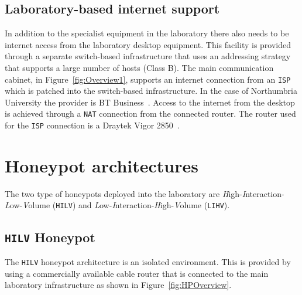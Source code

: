 \subsection{Laboratory-based internet support}
In addition to the specialist equipment in the laboratory there also needs to be internet access from the laboratory desktop equipment. This facility is provided through a separate switch-based infrastructure that uses an addressing strategy that supports a large number of hosts (Class B). The main communication cabinet, in Figure~\ref{fig:Overview1}, supports an internet connection from an \texttt{ISP} which is patched into the switch-based infrastructure. In the case of Northumbria University the provider is BT Business~\cite{BT:17}. Access to the internet from the desktop is achieved through a \texttt{NAT} connection from the connected router. The router used for the \texttt{ISP} connection is a Draytek Vigor 2850~\cite{DC:17}.

\section{Honeypot architectures}

The two type of honeypots deployed into the laboratory are \emph{H}igh-\emph{I}nteraction-\emph{L}ow-\emph{V}olume (\texttt{HILV}) and \emph{L}ow-\emph{I}nteraction-\emph{H}igh-\emph{V}olume (\texttt{LIHV}).

\subsection{\texttt{HILV} Honeypot}
The \texttt{HILV} honeypot architecture is an isolated environment. This is provided by using a commercially available cable router that is connected to the main laboratory infrastructure as shown in Figure~\ref{fig:HPOverview}. 

